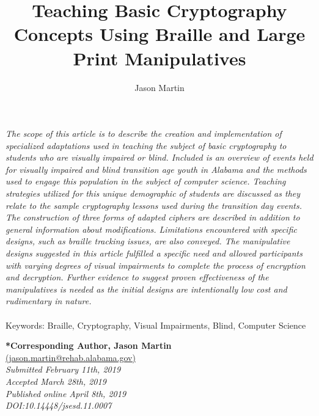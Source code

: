 \documentclass[11.5pt]{sig-alternate} %
\makeatletter
\let\oldabstract\abstract
\let\oldendabstract\endabstract
\renewenvironment{abstract} %
{\renewenvironment{quotation}%
               {\list{}{\addtolength{\leftmargin}{1em} %
                        \listparindent 1.5em%
                        \itemindent    \listparindent%
                        \rightmargin   \leftmargin%
                        \parsep        \z@ \@plus\p@}%
                \item\relax}%
               {\endlist}%
\oldabstract}
{\oldendabstract}
\makeatother
\begin{document}
\title{Teaching Basic Cryptography Concepts Using Braille and Large Print Manipulatives}

\author[1]{\large \color{blue}Jason Martin }


\toappear{}
\maketitle
\begin{@twocolumnfalse} 
\begin{abstract}
\item 
\textit {The scope of this article is to describe the creation and implementation of specialized adaptations used in teaching the subject of basic cryptography to students who are visually impaired or blind. Included is an overview of events held for visually impaired and blind transition age youth in Alabama and the methods used to engage this population in the subject of computer science. Teaching strategies utilized for this unique demographic of students are discussed as they relate to the sample  cryptography lessons used during the transition day events. The construction of  three forms of adapted ciphers are described in addition to general information about modifications. Limitations encountered with specific designs, such as braille tracking issues, are also conveyed. The manipulative designs suggested in this article fulfilled a specific need and allowed participants with varying degrees of visual impairments to complete the process of encryption and decryption. Further evidence to suggest proven effectiveness of the manipulatives is needed as the initial designs are intentionally low cost and rudimentary in nature.}
\\ \\
Keywords: Braille, Cryptography, Visual Impairments, Blind, Computer Science 
\end{abstract}
\end{@twocolumnfalse}


\textbf{*Corresponding Author, Jason Martin}\\
\href{mailto: jason.martin@rehab.alabama.gov }{(jason.martin@rehab.alabama.gov)} \\
\textit{Submitted February 11th, 2019 }\\
\textit{Accepted March 28th, 2019} \\
\textit{Published online April 8th, 2019} \\
\textit{DOI:10.14448/jsesd.11.0007} \\
\pagebreak
\clearpage
\end{document}
